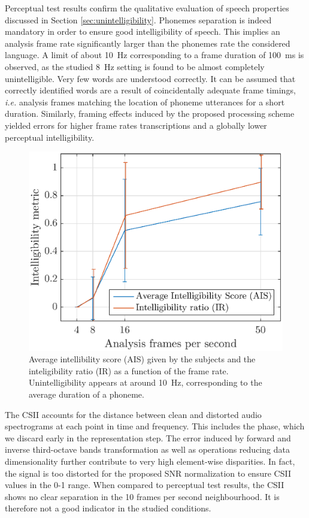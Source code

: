 \documentclass[12pt,times,onecolumn]{article}
\begin{document}
Perceptual test results confirm the qualitative evaluation of speech properties discussed in Section \ref{sec:unintelligibility}. Phonemes separation is indeed mandatory in order to ensure good intelligibility of speech. This implies an analysis frame rate significantly larger than the phonemes rate the considered language. A limit of about 10~Hz corresponding to a frame duration of 100~ms is observed, as the studied 8~Hz setting is found to be almost completely unintelligible. Very few words are understood correctly. It can be assumed that correctly identified words are a result of coincidentally adequate frame timings, \textit{i.e.} analysis frames matching the location of phoneme utterances for a short duration. Similarly, framing effects induced by the proposed processing scheme yielded errors for higher frame rates transcriptions and a globally lower perceptual intelligibility.\\


\begin{figure}[htbp]
	\centering
		\includegraphics[width=0.7\columnwidth]{figures/subj_int.eps}
	\caption{Average intellibility score (AIS) given by the subjects and the inteligibility ratio (IR) as a function of the frame rate. Unintelligibility appears at around 10~Hz, corresponding to the average duration of a phoneme.}
	\label{fig:subj_int}
\end{figure}

The CSII accounts for the distance between clean and distorted audio spectrograms at each point in time and frequency. This includes the phase, which we discard early in the representation step. The error induced by forward and inverse third-octave bands transformation as well as operations reducing data dimensionality further contribute to very high element-wise disparities. In fact, the signal is too distorted for the proposed SNR normalization to ensure CSII values in the 0-1 range. When compared to perceptual test results, the CSII shows no clear separation in the 10 frames per second neighbourhood. It is therefore not a good indicator in the studied conditions.\\
\end{document}
